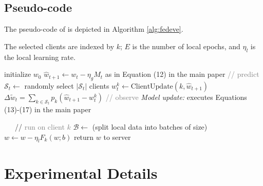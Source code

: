 \subsection{Pseudo-code}
The pseudo-code of \fedeve is depicted in Algorithm \ref{alg:fedeve}.

   \renewcommand{\algorithmicrequire}{\textbf{Server executes:}}
   \renewcommand{\algorithmicensure}{\textbf{ClientUpdate($k, w$):}}
    \begin{algorithm}[H] 
        \caption{\textbf{\fedeve} The selected clients are indexed by $k$; $E$ is the number of local epochs, and $\eta_l$ is the local learning
        rate.}\label{alg:fedeve}
        \begin{algorithmic}
        \REQUIRE
           \STATE initialize $w_0$
             \STATE $\hat{w}_{t+1}\leftarrow w_t-\eta_g M_t$ as in Equation (12) in the main paper  \textcolor{gray}{// predict}
             \STATE $\mathcal{S}_t \leftarrow$ randomly select $|\mathcal{S}_t|$ clients
               \STATE $w^k_t \leftarrow \text{ClientUpdate}(k, \hat{w}_{t+1})$ 
             \ENDFOR
             \STATE $\Delta \tilde{w}_{t}=\sum_{k \in \mathcal{S}_t}p_k \left(\hat{w}_{t+1}-w^k_t\right)$ \textcolor{gray}{// observe}
             \STATE \textit{Model update:} executes Equations (13)-(17) in the main paper
           \ENDFOR
           \STATE
  
         \ENSURE\ \ \  // \textcolor{gray}{run on client $k$} 
          \STATE $\mathcal{B} \leftarrow$ (split local data into batches of size)
              \STATE $w \leftarrow w - \eta_l F_k(w; b)$
            \ENDFOR
         \ENDFOR
         \STATE return $w$ to server
        \end{algorithmic}
        \end{algorithm}

\newpage
\section{Experimental Details}\label{exp:metrics}





